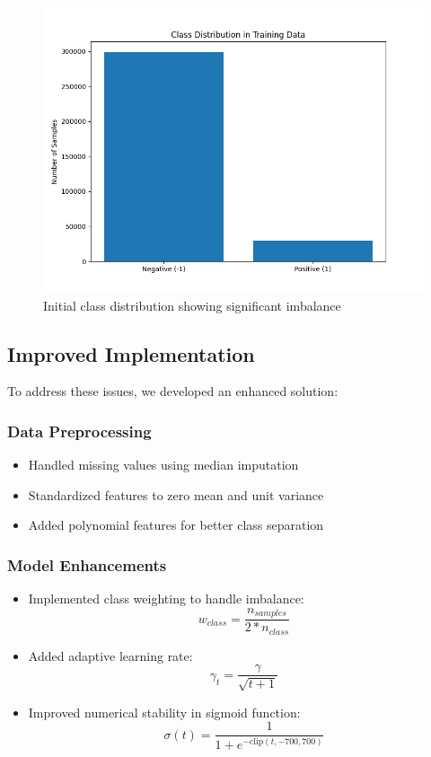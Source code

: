 \documentclass[10pt,conference,compsocconf]{IEEEtran}
\begin{document}
\begin{figure}[h]
    \centering
    \includegraphics[width=0.8\linewidth]{figures/class_distribution.png}
    \caption{Initial class distribution showing significant imbalance}
    \label{fig:class_dist}
\end{figure}

\subsection{Improved Implementation}
To address these issues, we developed an enhanced solution:

\subsubsection{Data Preprocessing}
\begin{itemize}
    \item Handled missing values using median imputation
    \item Standardized features to zero mean and unit variance
    \item Added polynomial features for better class separation
\end{itemize}

\subsubsection{Model Enhancements}
\begin{itemize}
    \item Implemented class weighting to handle imbalance:
    \begin{equation}
        w_{class} = \frac{n_{samples}}{2 * n_{class}}
    \end{equation}
    \item Added adaptive learning rate:
    \begin{equation}
        \gamma_t = \frac{\gamma}{\sqrt{t + 1}}
    \end{equation}
    \item Improved numerical stability in sigmoid function:
    \begin{equation}
        \sigma(t) = \frac{1}{1 + e^{-\text{clip}(t, -700, 700)}}
    \end{equation}
\end{itemize}
\end{document}

